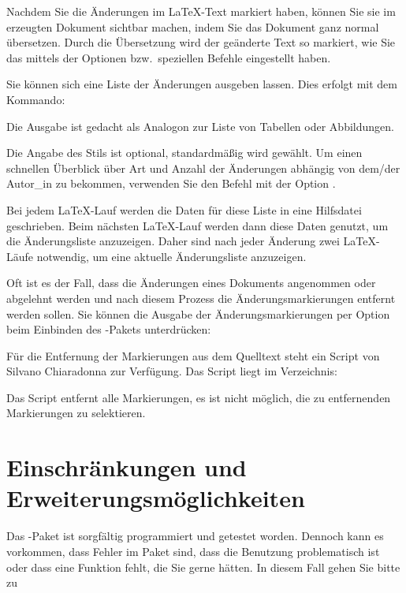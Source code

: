 Nachdem Sie die Änderungen im \LaTeX-Text markiert haben, können Sie sie im erzeugten Dokument sichtbar machen, indem Sie das Dokument ganz normal übersetzen.
Durch die Übersetzung wird der geänderte Text so markiert, wie Sie das mittels der Optionen bzw.\ speziellen Befehle eingestellt haben.


Sie können sich eine Liste der Änderungen ausgeben lassen.
Dies erfolgt mit dem Kommando:


Die Ausgabe ist gedacht als Analogon zur Liste von Tabellen oder Abbildungen.

Die Angabe des Stils ist optional, standardmäßig wird  gewählt.
Um einen schnellen Überblick über Art und Anzahl der Änderungen abhängig von dem/der Autor\_in zu bekommen, verwenden Sie den Befehl mit der Option .

Bei jedem \LaTeX-Lauf werden die Daten für diese Liste in eine Hilfsdatei geschrieben.
Beim nächsten \LaTeX-Lauf werden dann diese Daten genutzt, um die Änderungsliste anzuzeigen.
Daher sind nach jeder Änderung zwei \LaTeX-Läufe notwendig, um eine aktuelle Änderungsliste anzuzeigen.


Oft ist es der Fall, dass die Änderungen eines Dokuments angenommen oder abgelehnt werden und nach diesem Prozess die Änderungsmarkierungen entfernt werden sollen.
Sie können die Ausgabe der Änderungsmarkierungen per Option beim Einbinden des -Pakets unterdrücken:



Für die Entfernung der Markierungen aus dem Quelltext steht ein Script von Silvano Chiaradonna zur Verfügung.
Das Script liegt im Verzeichnis:



Das Script entfernt alle Markierungen, es ist nicht möglich, die zu entfernenden Markierungen zu selektieren.

\section{Einschränkungen und Erweiterungsmöglichkeiten}
\label{sec:limitations}

Das -Paket ist sorgfältig programmiert und getestet worden.
Dennoch kann es vorkommen, dass Fehler im Paket sind, dass die Benutzung problematisch ist oder dass eine Funktion fehlt, die Sie gerne hätten.
In diesem Fall gehen Sie bitte zu

